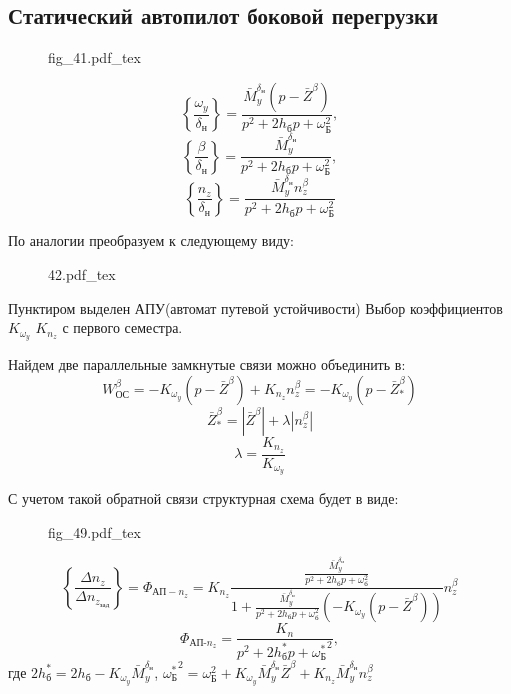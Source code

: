 \documentclass{article}
\newcommand{\incfig}[1]{
    {#1.pdf_tex}
}
\begin{document}
\subsection{Статический автопилот боковой перегрузки}

\begin{figure}[H]
	\centering
	{fig_41.pdf_tex}
\end{figure}

\[
	\left\{\frac{\omega_y}{\delta_\text{н}}\right\} =
	\frac{\bar{M}_y^{\delta_\text{н}}(p - \bar{Z}^\beta)}{ p^2 + 2 h_\text{б}p
	+ \omega_\text{Б}^2 },
\]
\[
	\left\{ \frac{\beta}{\delta_\text{н}} \right\} = \frac{
	\bar{M}_y^{\delta_\text{н}} }{ p^2 + 2 h_\text{б}p + \omega_\text{Б}^2 }
	,\]
\[
	\left\{ \frac{n_z}{\delta_\text{н}} \right\} = \frac{
	\bar{M}_y^{\delta_\text{н}} n_z^\beta }{ p^2 + 2 h_\text{б}p +
	\omega_\text{Б}^2 }
\]

По аналогии преобразуем к следующему виду:

\begin{figure}[H]
	\centering
	{42.pdf_tex}
\end{figure}


Пунктиром выделен АПУ(автомат путевой устойчивости)
Выбор коэффициентов $K_{\omega_y}$ $K_{n_z}$ с первого семестра.

Найдем две параллельные замкнутые связи можно объединить в:
\[
	W_\text{ОС}^\beta = - K_{\omega_y} (p - \bar{Z}^\beta) + K_{n_z} n_z^\beta
	= - K_{\omega_y}(p - \bar{Z}_*^\beta)
\]
\[
	\bar{Z}_*^\beta = |\bar{Z}^\beta| + \lambda |n_z^\beta|
\]
\[
	\lambda = \frac{K_{n_z}}{K_{\omega_y}}
\]

С учетом такой обратной связи структурная схема будет в виде:

\begin{figure}[ht]
	\centering
	\incfig{fig_49}
	\label{fig:fig_49}
\end{figure}

\[
	\left\{\frac{\Delta n_z}{\Delta n_{z_\text{зад}}} \right\}  =
	\Phi_{\text{АП}-n_z} = K_{n_z}\frac{\frac{\bar{M}_y^{\delta_\text{н}}}{p^2
	+ 2 h_\text{б} p + \omega_\text{б}^2}}{1
	+\frac{\bar{M}_y^{\delta_\text{н}}}{p^2 + 2 h_\text{б} p + \omega_\text{б}^2}
	(-K_{\omega_y}(p - \bar{Z}^\beta))}n_z^\beta
\]
\[
	\Phi_{\text{АП-}n_z} =\frac{K_n}{ p^2 + 2 h_\text{б}^*p +
	{\omega_\text{Б}^*}^2  },
\]
где $2h_\text{б}^* = 2h_\text{б} - K_{\omega_y}\bar{M}_y^{\delta_\text{н}}$,
${\omega_\text{Б}^*}^2 = \omega_\text{Б}^2 +
	K_{\omega_y}\bar{M}_y^{\delta_\text{н}} \bar{Z}^\beta + K_{n_z}
	\bar{M}_y^{\delta_\text{н}} n_z^\beta $
\end{document}

